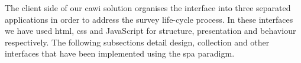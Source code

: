 	The client side of our \gls{cawi} solution organises the interface into three separated applications in order to address the survey life-cycle process. In these interfaces we have used \gls{html}, \gls{css} and JavaScript for structure, presentation and behaviour respectively. The following subsections detail design, collection and other interfaces that have been implemented using the \gls{spa} paradigm. 





